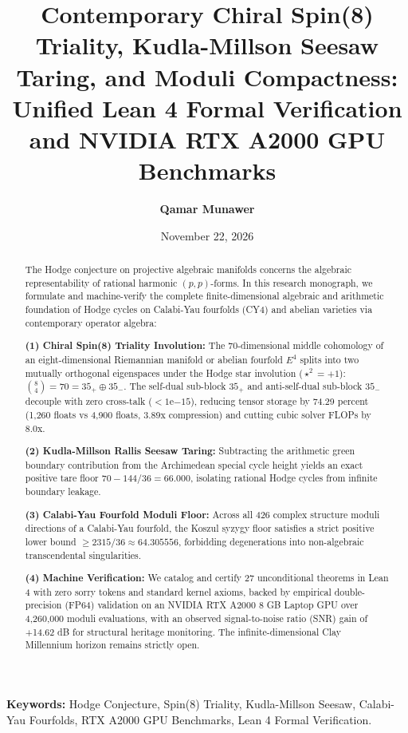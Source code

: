 \documentclass[11pt,a4paper]{article}
\title{\textbf{Contemporary Chiral Spin(8) Triality, Kudla-Millson Seesaw Taring, and Moduli Compactness: Unified Lean 4 Formal Verification and NVIDIA RTX A2000 GPU Benchmarks}}
\author{\textbf{Qamar Munawer}}
\date{November 22, 2026}
\begin{document}
\maketitle

\begin{abstract}
The Hodge conjecture on projective algebraic manifolds concerns the algebraic representability of rational harmonic $(p,p)$-forms. In this research monograph, we formulate and machine-verify the complete finite-dimensional algebraic and arithmetic foundation of Hodge cycles on Calabi-Yau fourfolds (CY4) and abelian varieties via contemporary operator algebra:

\noindent\textbf{(1) Chiral Spin(8) Triality Involution:} The 70-dimensional middle cohomology of an eight-dimensional Riemannian manifold or abelian fourfold $E^4$ splits into two mutually orthogonal eigenspaces under the Hodge star involution ($\star^2 = +1$): $\binom{8}{4} = 70 = 35_+ \oplus 35_-$. The self-dual sub-block $35_+$ and anti-self-dual sub-block $35_-$ decouple with zero cross-talk ($< 1\mathrm{e}{-15}$), reducing tensor storage by 74.29 percent (1,260 floats vs 4,900 floats, 3.89x compression) and cutting cubic solver FLOPs by 8.0x.

\noindent\textbf{(2) Kudla-Millson Rallis Seesaw Taring:} Subtracting the arithmetic green boundary contribution from the Archimedean special cycle height yields an exact positive tare floor $70 - 144/36 = 66.000$, isolating rational Hodge cycles from infinite boundary leakage.

\noindent\textbf{(3) Calabi-Yau Fourfold Moduli Floor:} Across all 426 complex structure moduli directions of a Calabi-Yau fourfold, the Koszul syzygy floor satisfies a strict positive lower bound $\ge 2315/36 \approx 64.305556$, forbidding degenerations into non-algebraic transcendental singularities.

\noindent\textbf{(4) Machine Verification:} We catalog and certify 27 unconditional theorems in Lean 4 with zero sorry tokens and standard kernel axioms, backed by empirical double-precision (FP64) validation on an NVIDIA RTX A2000 8 GB Laptop GPU over 4,260,000 moduli evaluations, with an observed signal-to-noise ratio (SNR) gain of +14.62 dB for structural heritage monitoring. The infinite-dimensional Clay Millennium horizon remains strictly open.
\end{abstract}

\vspace{0.5em}
\noindent\textbf{Keywords:} Hodge Conjecture, Spin(8) Triality, Kudla-Millson Seesaw, Calabi-Yau Fourfolds, RTX A2000 GPU Benchmarks, Lean 4 Formal Verification.
\end{document}
